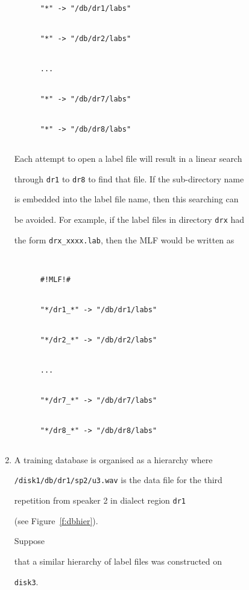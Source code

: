 \begin{enumerate}
\begin{verbatim}
      "*" -> "/db/dr1/labs"


      "*" -> "/db/dr2/labs"


      ...


      "*" -> "/db/dr7/labs"


      "*" -> "/db/dr8/labs"


\end{verbatim}      


Each attempt to open a label file will result in a linear search


through \texttt{dr1} to \texttt{dr8} to find that file.  If the sub-directory name


is embedded into the label file name, then this searching can


be avoided.  For example, if the label files in directory \texttt{drx} had


the form \texttt{drx\_xxxx.lab}, then the MLF would be written as


\begin{verbatim}


      #!MLF!#


      "*/dr1_*" -> "/db/dr1/labs"


      "*/dr2_*" -> "/db/dr2/labs"


      ...


      "*/dr7_*" -> "/db/dr7/labs"


      "*/dr8_*" -> "/db/dr8/labs"


\end{verbatim}   





\item


A training database is organised as a hierarchy where 


\texttt{/disk1/db/dr1/sp2/u3.wav} is the data file for the third


repetition from speaker 2 in dialect region \texttt{dr1}


(see Figure~\ref{f:dbhier}).  










Suppose


that a similar hierarchy of label files was constructed on


\texttt{disk3}.



\end{enumerate}
